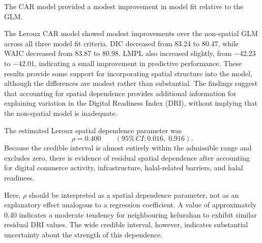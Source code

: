 \documentclass[
  default,
]{sn-jnl}
\begin{document}
The CAR model provided a modest improvement in model fit relative to the
GLM.

\begin{table}[h]

\caption{\label{tbl-modelfit}Model fit comparison between GLM and Leroux
CAR}


\end{table}%

The Leroux CAR model showed modest improvements over the non-spatial GLM
across all three model fit criteria. DIC decreased from 83.24 to 80.47,
while WAIC decreased from 83.87 to 80.98. LMPL also increased slightly,
from −42.23 to −42.01, indicating a small improvement in predictive
performance. These results provide some support for incorporating
spatial structure into the model, although the differences are modest
rather than substantial. The findings suggest that accounting for
spatial dependence provides additional information for explaining
variation in the Digital Readiness Index (DRI), without implying that
the non-spatial model is inadequate.

The estimated Leroux spatial dependence parameter was \[
\rho=0.400
\qquad
(95\%\,CI: 0.016,\;0.916).
\] Because the credible interval is almost entirely within the
admissible range and excludes zero, there is evidence of residual
spatial dependence after accounting for digital commerce activity,
infrastructure, halal-related barriers, and halal readiness.

Here, \(\rho\) should be interpreted as a spatial dependence parameter,
not as an explanatory effect analogous to a regression coefficient. A
value of approximately 0.40 indicates a moderate tendency for
neighbouring kelurahan to exhibit similar residual DRI values. The wide
credible interval, however, indicates substantial uncertainty about the
strength of this dependence.
\end{document}
